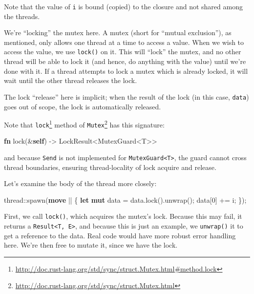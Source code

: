 \documentclass[a4paper,]{book}
\newenvironment{Shaded}{\begin{snugshade}}{\end{snugshade}}
\newcommand{\KeywordTok}[1]{\textcolor[rgb]{0.13,0.29,0.53}{\textbf{{#1}}}}
\newcommand{\DecValTok}[1]{\textcolor[rgb]{0.00,0.00,0.81}{{#1}}}
\newcommand{\NormalTok}[1]{{#1}}
\renewcommand{\href}[2]{#2\footnote{\url{#1}}}
\begin{document}
Note that the value of \texttt{i} is bound (copied) to the closure and
not shared among the threads.

We're ``locking'' the mutex here. A mutex (short for ``mutual
exclusion''), as mentioned, only allows one thread at a time to access a
value. When we wish to access the value, we use \texttt{lock()} on it.
This will ``lock'' the mutex, and no other thread will be able to lock
it (and hence, do anything with the value) until we're done with it. If
a thread attempts to lock a mutex which is already locked, it will wait
until the other thread releases the lock.

The lock ``release'' here is implicit; when the result of the lock (in
this case, \texttt{data}) goes out of scope, the lock is automatically
released.

Note that
\href{http://doc.rust-lang.org/std/sync/struct.Mutex.html\#method.lock}{\texttt{lock}}
method of
\href{http://doc.rust-lang.org/std/sync/struct.Mutex.html}{\texttt{Mutex}}
has this signature:

\begin{Shaded}
\begin{Highlighting}[]
\KeywordTok{fn} \NormalTok{lock(&}\KeywordTok{self}\NormalTok{) -> LockResult<MutexGuard<T>>}
\end{Highlighting}
\end{Shaded}

and because \texttt{Send} is not implemented for
\texttt{MutexGuard\textless{}T\textgreater{}}, the guard cannot cross
thread boundaries, ensuring thread-locality of lock acquire and release.

Let's examine the body of the thread more closely:

\begin{Shaded}
\begin{Highlighting}[]
\NormalTok{thread::spawn(}\KeywordTok{move} \NormalTok{|| \{}
    \KeywordTok{let} \KeywordTok{mut} \NormalTok{data = data.lock().unwrap();}
    \NormalTok{data[}\DecValTok{0}\NormalTok{] += i;}
\NormalTok{\});}
\end{Highlighting}
\end{Shaded}

First, we call \texttt{lock()}, which acquires the mutex's lock. Because
this may fail, it returns a
\texttt{Result\textless{}T,\ E\textgreater{}}, and because this is just
an example, we \texttt{unwrap()} it to get a reference to the data. Real
code would have more robust error handling here. We're then free to
mutate it, since we have the lock.
\end{document}
